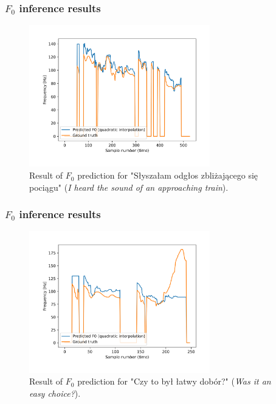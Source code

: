 \documentclass[a4paper,9pt]{beamer}
\theoremstyle{mytheoremstyle}
\begin{document}
\begin{frame}
\frametitle{$F_{0}$ inference results}
\begin{figure}
\begin{center}
  \includegraphics[width=0.7\textwidth]{res/amu_pl_ilo_BAZA_2006A_zbitki_A0036_simple_pred_freq}
\end{center}
	\caption{Result of $F_0$ prediction for "S\l{}ysza\l{}am odg\l{}os zbli\.zaj\k{a}cego si\k{e} poci\k{a}gu" (\textit{I heard the sound of an approaching train}).}
\end{figure}
\end{frame}

\begin{frame}
\frametitle{$F_{0}$ inference results}
\begin{figure}
\begin{center}
  \includegraphics[width=0.7\textwidth]{res/amu_pl_ilo_BAZA_2006C_C0160_simple_pred_freq}
\end{center}
	\caption{Result of $F_0$ prediction for "Czy to by\l{} \l{}atwy dob\'or?" (\textit{Was it an easy choice?}).}
\end{figure}
\end{frame}
\end{document}
